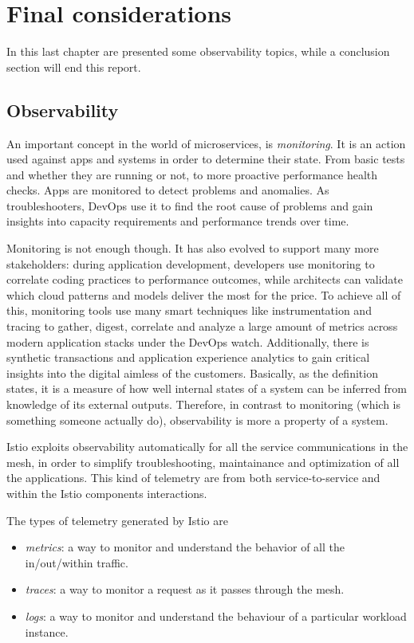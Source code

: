 \chapter{Final considerations}
In this last chapter are presented some observability topics, while a conclusion section will end this report.
\minitoc

\section{Observability}
An important concept in the world of microservices, is \textit{monitoring}. It is an action used against apps and systems in order to determine their state. From basic tests and whether they are running or not, to more proactive performance health checks. Apps are monitored to detect problems and anomalies. As troubleshooters, DevOps use it to find the root cause of problems and gain insights into capacity requirements and performance trends over time.

Monitoring is not enough though. It has also evolved to support many more stakeholders: during application development, developers use monitoring to correlate coding practices to performance outcomes, while architects can validate which cloud patterns and models deliver the most for the price.
To achieve all of this, monitoring tools use many smart techniques like instrumentation and tracing to gather, digest, correlate and analyze a large amount of metrics across modern application stacks under the DevOps watch. Additionally, there is synthetic transactions and application experience analytics to gain critical insights into the digital aimless of the customers.
Basically, as the definition states, it is a measure of how well internal states of a system can be inferred from knowledge of its external outputs. Therefore, in contrast to monitoring (which is something someone actually do), observability is more a property of a system.

Istio exploits observability automatically for all the service communications in the mesh, in order to simplify troubleshooting, maintainance and optimization of all the applications. This kind of telemetry are from both service-to-service and within the Istio components interactions.

The types of telemetry generated by Istio are 
\begin{itemize}
    \item \textit{metrics}: a way to monitor and understand the behavior of all the in/out/within traffic. 
    \item \textit{traces}: a way to monitor a request as it passes through the mesh.
    \item \textit{logs}: a way to monitor and understand the behaviour of a particular workload instance.
\end{itemize}

